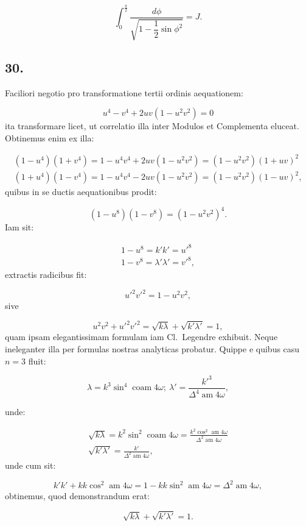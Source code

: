 \documentclass{article}
\begin{document}
\[
\int_{0}^{\frac{\pi}{2}}\frac{d\phi}{\sqrt{1-\dfrac{1}{2}\sin\phi^{2}}}=J.
\]

\subsection*{30.}

Faciliori negotio pro transformatione tertii ordinis aequationem:

\[
u^{4}-v^{4}+2uv(1-u^{2}v^{2})=0
\]
ita transformare licet, ut correlatio illa inter Modulos et Complementa eluceat. Obtinemus enim ex illa:

\[
\begin{gathered}
(1-u^{4})(1+v^{4})=1-u^{4}v^{4}+2uv(1-u^{2}v^{2})=(1-u^{2}v^{2})(1+uv)^{2}\\
(1+u^{4})(1-v^{4})=1-u^{4}v^{4}-2uv(1-u^{2}v^{2})=(1-u^{2}v^{2})(1-uv)^{2},
\end{gathered}
\]
quibus in se ductis aequationibus prodit:

\[
(1-u^{8})(1-v^{8})=(1-u^{2}v^{2})^{4}.
\]
Iam sit:

\[
\begin{gathered}
1-u^{8}=k'k'=u'^{8}\\
1-v^{8}=\lambda'\lambda'=v'^{8},
\end{gathered}
\]
extractis radicibus fit:

\[
u'^{2}v'^{2}=1-u^{2}v^{2},
\]
sive

\[
u^{2}v^{2}+u'^{2}v'^{2}=\sqrt{k\lambda}+\sqrt{k'\lambda'}=1,
\]
quam ipsam elegantissimam formulam iam Cl.\ Legendre exhibuit. Neque ineleganter illa per formulas nostras analyticas probatur. Quippe e quibus casu $n=3$ fluit:

\[
\lambda=k^{3}\sin^{4}\operatorname{coam}4\omega;\ \lambda'=\frac{k'^{3}}{\Delta^{4}\operatorname{am}4\omega},
\]

unde:

\[
\begin{gathered}
\sqrt{k\lambda}=k^{2}\sin^{2}\operatorname{coam}4\omega=\frac{k^{2}\cos^{2}\operatorname{am}4\omega}{\Delta^{2}\operatorname{am}4\omega}\\[1.5ex]
\sqrt{k'\lambda'}=\frac{k'}{\Delta^{2}\operatorname{am}4\omega},
\end{gathered}
\]
unde cum sit:

\[
k'k'+kk\cos^{2}\operatorname{am}4\omega=1-kk\sin^{2}\operatorname{am}4\omega=\Delta^{2}\operatorname{am}4\omega,
\]
obtinemus, quod demonstrandum erat:

\[
\sqrt{k\lambda}+\sqrt{k'\lambda'}=1.
\]
\end{document}
